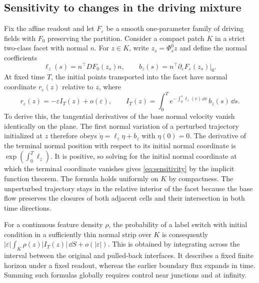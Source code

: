 \subsection{Sensitivity to changes in the driving mixture}
\label{sec:sensitivity}
Fix the affine readout and let $F_\varepsilon$ be a smooth
one-parameter family of driving fields with $F_0$ preserving the
partition. Consider a compact patch $K$ in a strict two-class
facet with normal $n$. For $z\in K$, write $z_s=\Phi_s^0 z$ and
define the normal coefficients
\[
 \ell_z(s)=n^\top DF_0(z_s)n,\qquad
 b_z(s)=n^\top \partial_\varepsilon F_\varepsilon(z_s)\big|_0.
\]
At fixed time $T$, the initial points transported into the facet
have normal coordinate $r_\varepsilon(z)$ relative to $z$, where
\begin{equation}
 r_\varepsilon(z)=-\varepsilon I_T(z)+o(\varepsilon),
 \qquad
 I_T(z)=\int_0^T
       e^{-\int_0^s \ell_z(v)\,\dd v}\,b_z(s)\,\dd s .
 \label{eq:sensitivity}
\end{equation}
To derive this, the tangential derivatives of the base normal
velocity vanish identically on the plane. The first normal
variation of a perturbed trajectory initialized at $z$ therefore
obeys $\dot\eta=\ell_z\eta+b_z$ with $\eta(0)=0$.
The derivative of the terminal normal position with respect to
its initial normal coordinate is $\exp(\int_0^T\ell_z)$.
It is positive, so solving for the initial normal coordinate at
which the terminal coordinate vanishes gives \eqref{eq:sensitivity}
by the implicit function theorem. The formula holds uniformly on
$K$ by compactness. The unperturbed trajectory stays in the
relative interior of the facet because the base flow preserves
the closures of both adjacent cells and their intersection in
both time directions.

For a continuous feature density $\rho$, the probability of a
label switch with initial condition in a sufficiently thin
normal strip over $K$ is consequently
$|\varepsilon|\int_K\rho(z)|I_T(z)|\,\dd S+o(|\varepsilon|)$.
This is obtained by integrating across the interval between the
original and pulled-back interfaces. It describes a fixed finite
horizon under a fixed readout, whereas the earlier boundary flux
expands in time. Summing such formulas globally requires control
near junctions and at infinity.
